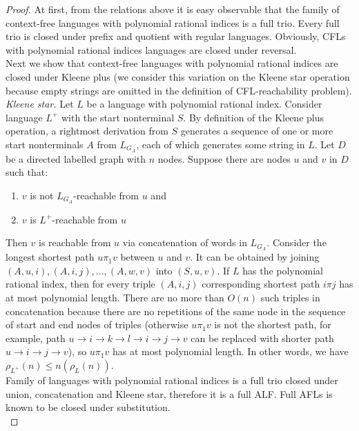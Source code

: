 \begin{proof}

At first, from the relations above it is easy observable that the family of context-free languages with polynomial rational indices is a full trio. Every full trio is closed under prefix and quotient with regular languages. Obviously, CFLs with polynomial rational indices languages are closed under reversal. 
\\
Next we show that context-free languages with polynomial rational indices are closed under Kleene plus (we consider this variation on the Kleene star operation because empty strings are omitted in the definition of CFL-reachability problem).
\\ 
\textit{Kleene star.} Let $L$ be a language with polynomial rational index. Consider language $L^{+}$ with the start nonterminal $S$. By definition of the Kleene plus operation, a rightmost derivation from $S$ generates a sequence of one or more start nonterminals $A$ from $L_{G_{A}}$, each of which generates some string in $L$. Let $D$ be a directed labelled graph with $n$ nodes. Suppose there are nodes $u$ and $v$ in $D$ such that:
\begin{enumerate}
\item $v$ is not $L_{G_{A}}$-reachable from $u$ and
\item $v$ is  $L^+$-reachable from $u$
\end{enumerate}
Then $v$ is reachable from $u$ via concatenation of words in $L_{G_{A}}$. Consider the longest shortest path $u\pi_1 v$ between $u$ and $v$. It can be obtained by joining $(A, u, i), (A, i, j), ..., (A, w, v)$ into $(S, u, v)$.  If $L$ has the polynomial rational index, then for every triple $(A, i, j)$ corresponding shortest path $i \pi j$ has at most polynomial length. There are no more than $O(n)$ such triples in concatenation because there are no repetitions of the same node in the sequence of start and end nodes of triples (otherwise $u\pi_1 v$ is not the shortest path, for example, path $u \rightarrow i \rightarrow k \rightarrow l \rightarrow i \rightarrow j \rightarrow v$ can be replaced with shorter path $u \rightarrow i  \rightarrow j \rightarrow v$), so $u\pi_1 v$ has at most polynomial length. In other words, we have $\rho_{L^+}(n) \le n(\rho_L(n))$.
\\
Family of languages with polynomial rational indices is a full trio closed under union, concatenation and Kleene star, therefore it is a full ALF. Full AFLs is known to be closed under substitution.
\\

\end{proof}
